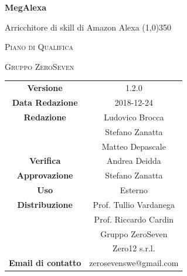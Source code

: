 \documentclass[a4paper,12pt]{book}
\author{Stefano Zanatta}
\date{2018-12-24}
\begin{document}
\begin{titlepage}
	\centering
	{\huge\bfseries MegAlexa\par}
	Arricchitore di skill di Amazon Alexa
	\line(1,0){350} \\
	{\scshape\LARGE Piano di Qualifica \par}
	\vspace{1cm}
	{\scshape Gruppo ZeroSeven \par}
	\logo
	\begin{tabular}{c|c}
		{\hfill \textbf{Versione}} 			& 1.2.0				\\
		{\hfill\textbf{Data Redazione}} 	& 2018-12-24		\\ 
		{\hfill\textbf{Redazione}} 			&  Ludovico Brocca\\ &		Stefano Zanatta			\\& Matteo Depascale\\
	{\hfill\textbf{Verifica}} 				&  	Andrea Deidda			\\ 
		{\hfill\textbf{Approvazione}} 		&  		Stefano Zanatta			\\ 
	{\hfill\textbf{Uso}} 					& 		Esterno		\\ 
	{\hfill\textbf{Distribuzione}} 			& 			Prof. Tullio Vardanega \\ & Prof. Riccardo Cardin \\ & Gruppo ZeroSeven		\\ & Zero12 s.r.l. \\
		{\hfill\textbf{Email di contatto}} & zerosevenswe@gmail.com \\
	\end{tabular}
\end{titlepage}
	

	
	\label{LastFrontPage}
	\newpage	
	
	\pagestyle{mymain}
	\tableofcontents
	\listoftables
	
	
	

	\begin{appendices}
		
		
	\end{appendices}

			
	\label{LastPage}
\end{document}
